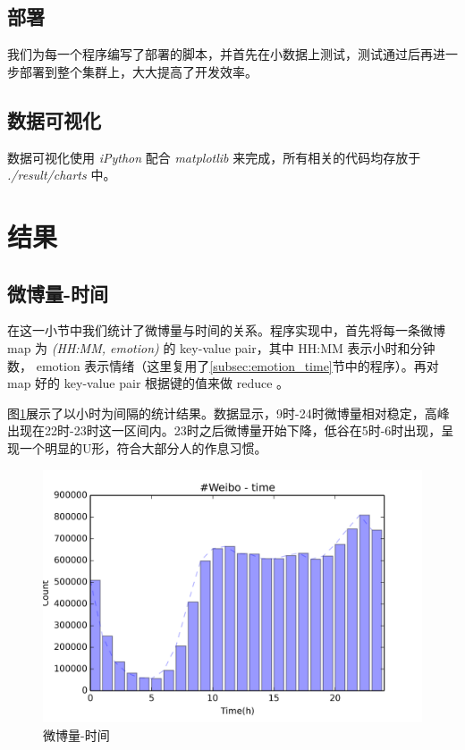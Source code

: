 \documentclass[12pt, oneside]{article}
\begin{document}
\begin{spacing}{1.5}
\begin{CJK}{UTF8}{gbsn}
\subsection{部署}
我们为每一个程序编写了部署的脚本，并首先在小数据上测试，测试通过后再进一步部署到整个集群上，大大提高了开发效率。

\subsection{数据可视化}
数据可视化使用 {\it iPython} 配合 {\it matplotlib} 来完成，所有相关的代码均存放于 {\it ./result/charts} 中。

\newpage

\section{结果}
\subsection{微博量-时间}
\label{subsec:weibo_time}
在这一小节中我们统计了微博量与时间的关系。程序实现中，首先将每一条微博 map 为 {\it(HH:MM, emotion)} 的 key-value pair，其中 HH:MM 表示小时和分钟数， emotion 表示情绪（这里复用了\ref{subsec:emotion_time}节中的程序）。再对 map 好的 key-value pair 根据键的值来做 reduce 。 

图\ref{fig:weibo_time}展示了以小时为间隔的统计结果。数据显示，9时-24时微博量相对稳定，高峰出现在22时-23时这一区间内。23时之后微博量开始下降，低谷在5时-6时出现，呈现一个明显的U形，符合大部分人的作息习惯。

\begin{figure}
	\centering
	\includegraphics[width=0.8\linewidth]{../result/charts/weibo_time}
	\caption{微博量-时间}
	\label{fig:weibo_time}
\end{figure}


\end{CJK}
\end{spacing}
\end{document}

